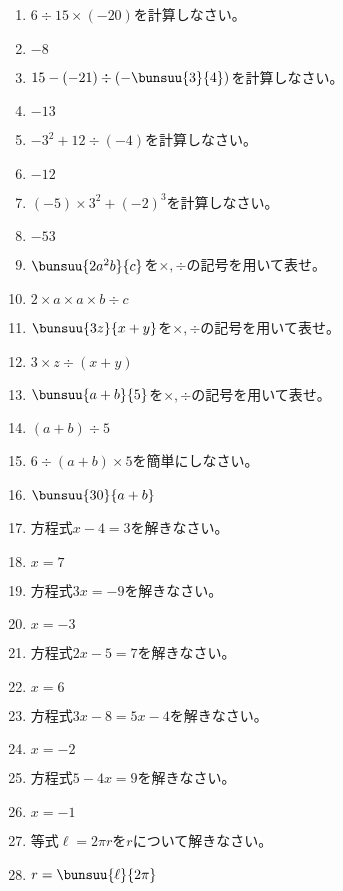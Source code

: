 \documentclass[uplatex,a4j,11pt]{jsreport}
\begin{document}
\begin{multicols}{2}
\begin{enumerate}
    \item $6\div15\times (-20)$\quad を計算しなさい。%
    \item $-8$
    \item $15-(-21)\div \left(-\bunsuu{3}{4}\right)$\quad を計算しなさい。%
    \item $-13$
    \item $-3^2+12\div (-4)$\quad を計算しなさい。%
    \item $-12$
    \item $(-5)\times3^2+(-2)^3$\quad を計算しなさい。%
    \item $-53$
    \item $\bunsuu{2a^2b}{c}$\quad を$\times,\div$の記号を用いて表せ。%
    \item $2\times a \times a \times b \div c$
    \item $\bunsuu{3z}{x+y}$\quad を$\times,\div$の記号を用いて表せ。%
    \item $3\times z \div (x+y)$
    \item $\bunsuu{a+b}{5}$\quad を$\times,\div$の記号を用いて表せ。%
    \item $(a+b)\div 5$
    \item $6\div (a+b)\times 5$\quad を簡単にしなさい。%
    \item $\bunsuu{30}{a+b}$
    \item 方程式\quad$x-4=3$\quad を解きなさい。%
    \item $x=7$
    \item 方程式\quad$3x=-9$\quad を解きなさい。%
    \item $x=-3$
    \item 方程式\quad$2x-5=7$\quad を解きなさい。%
    \item $x=6$
    \item 方程式\quad$3x-8=5x-4$\quad を解きなさい。%
    \item $x=-2$
    \item 方程式\quad$5-4x=9$\quad を解きなさい。%
    \item $x=-1$
    \item 等式\quad$\ell=2\pi r$\quad を\quad$r$\quad について解きなさい。%
    \item $r=\bunsuu{\ell}{2\pi}$

\end{enumerate}
\end{multicols}
\end{document}

